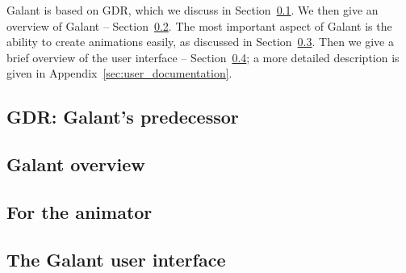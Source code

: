 Galant is based on GDR, which we discuss in Section~\ref{sec:gdr_features}.
We then give an overview of Galant -- Section~\ref{sec:galant_overview}.
The most important aspect of Galant is the ability to create animations easily,
as discussed in Section~\ref{sec:animator}.
Then we give a brief overview of the user interface --
Section~\ref{sec:user_interface}; a more detailed description is given in Appendix~\ref{sec:user_documentation}.

\subsection{GDR: Galant's predecessor}
\label{sec:gdr_features}





\subsection{Galant overview}
\label{sec:galant_overview}


\subsection{For the animator}
\label{sec:animator}


%

\subsection{The Galant user interface}
\label{sec:user_interface}


